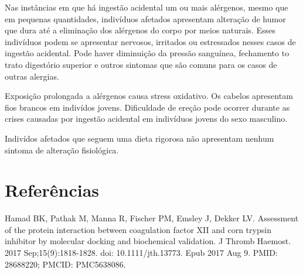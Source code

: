\documentclass{article}
\begin{document}
Nas instâncias em que há ingestão acidental um ou mais alérgenos, mesmo
que em pequenas quantidades, indivíduos afetados apresentam alteração de
humor que dura até a eliminação dos alérgenos do corpo por meios naturais.
Esses indivíduos podem se apresentar nervosos, irritados ou estressados
nesses casos de ingestão acidental. Pode haver diminuição da pressão
sanguínea, fechamento to trato digestório superior e outros sintomas que
são comuns para os casos de outras alergias.

Exposição prolongada a alérgenos causa stress oxidativo. Os cabelos
apresentam fios brancos em indivídos jovens. Dificuldade de ereção pode
ocorrer durante as crises causadas por ingestão acidental em indivíduos
jovens do sexo masculino.

Indivídos afetados que seguem uma dieta rigorosa não apresentam nenhum
sintoma de alteração fisiológica.

\section{Referências}

Hamad BK, Pathak M, Manna R, Fischer PM, Emsley J, Dekker LV. Assessment of the protein interaction between coagulation factor XII and corn trypsin inhibitor by molecular docking and biochemical validation. J Thromb Haemost. 2017 Sep;15(9):1818-1828. doi: 10.1111/jth.13773. Epub 2017 Aug 9. PMID: 28688220; PMCID: PMC5638086.
\end{document}
